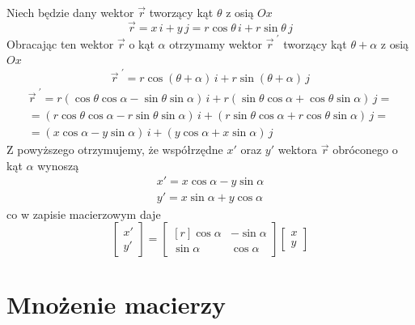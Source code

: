 \documentclass[12pt,a4paper,leqno]{article}
\numberwithin{equation}{section}
\begin{document}
Niech będzie dany wektor $\vec{r}$ tworzący kąt $\theta$ z osią $Ox$
\begin{equation}
\vec{r} = x \, i + y \, j = r \cos \theta \, i + r \sin \theta \, j 
\end{equation}
Obracając ten wektor $\vec{r}$ o kąt $\alpha$ 
otrzymamy wektor $\vec{r}^{\,\,'}$ tworzący kąt $\theta + \alpha$ z osią $Ox$
\begin{equation}
\vec{r}^{\,\,'} = r \cos( \theta + \alpha ) \, i + r \sin( \theta + \alpha ) \, j
\end{equation}
\begin{eqnarray}
\vec{r}^{\,\,'} = r (\cos \theta \cos \alpha - \sin \theta \sin \alpha) \, i
+                 r (\sin \theta \cos \alpha + \cos \theta \sin \alpha) \, j         =  \\ \nonumber
=
( r \cos \theta \cos \alpha - r \sin \theta \sin \alpha ) \, i 
+
( r \sin \theta \cos \alpha + r \cos \theta \sin \alpha ) \, j                       =  \\ \nonumber
=
( x \cos \alpha - y \sin \alpha ) \, i 
+
( y \cos \alpha + x \sin \alpha ) \, j 
\end{eqnarray}
Z powyższego otrzymujemy, że współrzędne $x'$ oraz $y'$ wektora $\vec{r}$ obróconego o kąt $\alpha$  wynoszą
\begin{eqnarray}
x' = x \cos \alpha - y \sin \alpha      \\ 
y' = x \sin \alpha + y \cos \alpha
\end{eqnarray}
co w zapisie macierzowym daje
\begin{equation}
\begin{bmatrix}
x' \\ 
y' 
\end{bmatrix}
=
\begin{bmatrix*}[r]
 \cos \alpha  & -\sin \alpha  \\
 \sin \alpha  &  \cos \alpha
\end{bmatrix*}
\begin{bmatrix}
x \\ 
y 
\end{bmatrix}
\end{equation}



\section{Mnożenie macierzy}\label{sec3}
\end{document}
